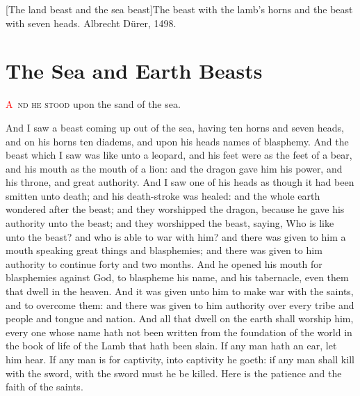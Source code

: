 [The land beast and the sea beast]{The beast with the lamb's horns and the beast with seven heads. Albrecht Dürer, 1498.}

\chapter{The Sea and Earth Beasts}
\lettrine[lines=3]{\textcolor{red}{A}}{\ nd he stood} upon the sand of the sea.

And I saw a beast coming up out of the sea, having ten horns and seven heads, and on his horns ten diadems, and upon his heads names of blasphemy. 
 And the beast which I saw was like unto a leopard, and his feet were as the feet of a bear, and his mouth as the mouth of a lion: and the dragon gave him his power, and his throne, and great authority. 
 And I saw one of his heads as though it had been smitten unto death; and his death-stroke was healed: and the whole earth wondered after the beast; 
 and they worshipped the dragon, because he gave his authority unto the beast; and they worshipped the beast, saying, Who is like unto the beast? and who is able to war with him? 
 and there was given to him a mouth speaking great things and blasphemies; and there was given to him authority to continue forty and two months. 
 And he opened his mouth for blasphemies against God, to blaspheme his name, and his tabernacle, even them that dwell in the heaven. 
 And it was given unto him to make war with the saints, and to overcome them: and there was given to him authority over every tribe and people and tongue and nation. 
 And all that dwell on the earth shall worship him, every one whose name hath not been written from the foundation of the world in the book of life of the Lamb that hath been slain. 
 If any man hath an ear, let him hear. 
 If any man is for captivity, into captivity he goeth: if any man shall kill with the sword, with the sword must he be killed. Here is the patience and the faith of the saints.

